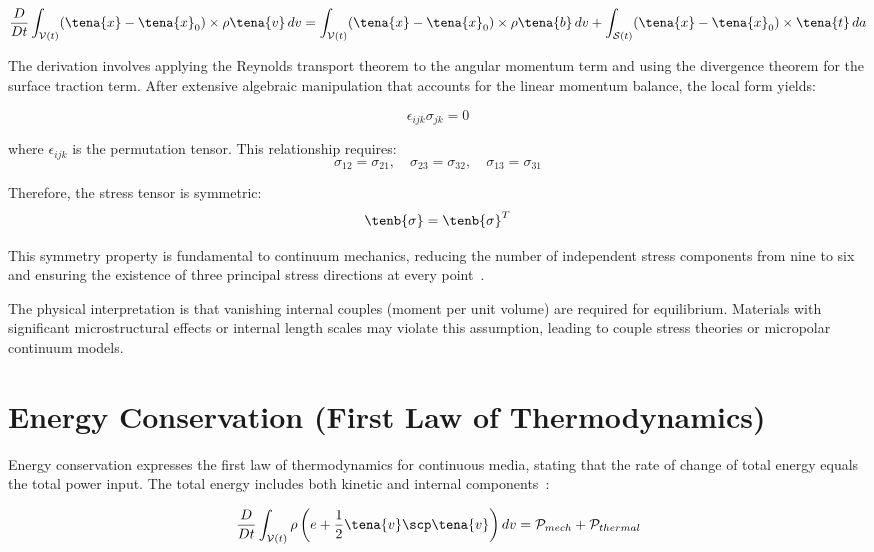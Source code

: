 \begin{equation}
\frac{D}{Dt}\int_{\mathcal{V}(t)} (\tena{x} - \tena{x}_0) \times \rho \tena{v} \, dv = \int_{\mathcal{V}(t)} (\tena{x} - \tena{x}_0) \times \rho \tena{b} \, dv + \int_{\mathcal{S}(t)} (\tena{x} - \tena{x}_0) \times \tena{t} \, da
\end{equation}

The derivation involves applying the Reynolds transport theorem to the angular momentum term and using the divergence theorem for the surface traction term. After extensive algebraic manipulation that accounts for the linear momentum balance, the local form yields:

\begin{equation}
\epsilon_{ijk} \sigma_{jk} = 0
\end{equation}

where $\epsilon_{ijk}$ is the permutation tensor. This relationship requires:
\begin{equation}
\sigma_{12} = \sigma_{21}, \quad \sigma_{23} = \sigma_{32}, \quad \sigma_{13} = \sigma_{31}
\end{equation}

Therefore, the stress tensor is symmetric:
\begin{equation}
\tenb{\sigma} = \tenb{\sigma}^T
\end{equation}

This symmetry property is fundamental to continuum mechanics, reducing the number of independent stress components from nine to six and ensuring the existence of three principal stress directions at every point~\autocite{Sadd.2019}.

The physical interpretation is that vanishing internal couples (moment per unit volume) are required for equilibrium. Materials with significant microstructural effects or internal length scales may violate this assumption, leading to couple stress theories or micropolar continuum models.

\section{Energy Conservation (First Law of Thermodynamics)}

Energy conservation expresses the first law of thermodynamics for continuous media, stating that the rate of change of total energy equals the total power input. The total energy includes both kinetic and internal components~\autocite{Sadd.2019}:

\begin{equation}
\frac{D}{Dt}\int_{\mathcal{V}(t)} \rho \left(e + \frac{1}{2}\tena{v} \scp \tena{v}\right) dv = \mathcal{P}_{mech} + \mathcal{P}_{thermal}
\end{equation}

